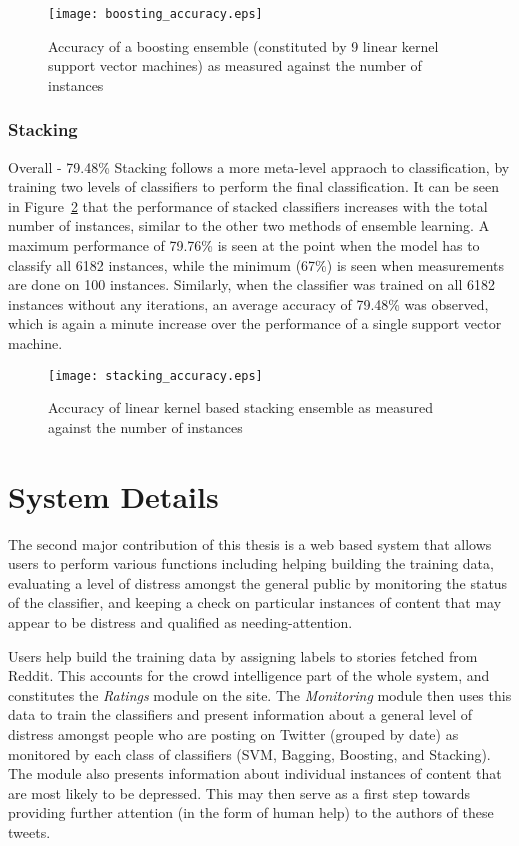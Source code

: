 \begin{figure}
    \centering
    \texttt{[image: boosting\_accuracy.eps]}
    \caption{Accuracy of a boosting ensemble (constituted by 9 linear kernel support vector machines) as measured against the number of instances}
    \label{fig:boosting_accuracy}
\end{figure}

\subsubsection{Stacking}
Overall - 79.48\%
Stacking follows a more meta-level appraoch to classification, by training two levels of classifiers to perform the final classification. It can be seen in Figure~\ref{fig:stacking_accuracy} that the performance of stacked classifiers increases with the total number of instances, similar to the other two methods of ensemble learning. A maximum performance of 79.76\% is seen at the point when the model has to classify all 6182 instances, while the minimum (67\%) is seen when measurements are done on 100 instances. Similarly, when the classifier was trained on all 6182 instances without any iterations, an average accuracy of 79.48\% was observed, which is again a minute increase over the performance of a single support vector machine.

\begin{figure}
    \centering
    \texttt{[image: stacking\_accuracy.eps]}
    \caption{Accuracy of linear kernel based stacking ensemble as measured against the number of instances}
    \label{fig:stacking_accuracy}
\end{figure}

\section{System Details}
\label{section:system_details}

The second major contribution of this thesis is a web based system that allows users to perform various functions including helping building the training data, evaluating a level of distress amongst the general public by monitoring the status of the classifier, and keeping a check on particular instances of content that may appear to be distress and qualified as needing-attention.

Users help build the training data by assigning labels to stories fetched from Reddit. This accounts for the crowd intelligence part of the whole system, and constitutes the \emph{Ratings} module on the site. The \emph{Monitoring} module then uses this data to train the classifiers and present information about a general level of distress amongst people who are posting on Twitter (grouped by date) as monitored by each class of classifiers (SVM, Bagging, Boosting, and Stacking). The module also presents information about individual instances of content that are most likely to be depressed. This may then serve as a first step towards providing further attention (in the form of human help) to the authors of these tweets.

